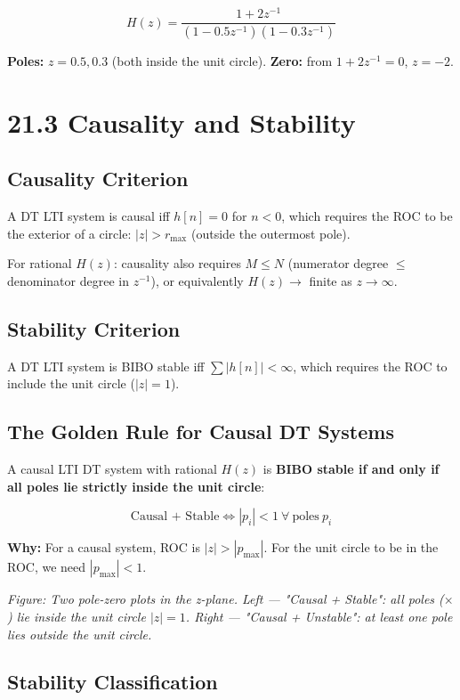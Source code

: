 \documentclass[11pt]{article}
\begin{document}
\[H(z) = \frac{1 + 2 z^{-1}}{(1 - 0.5 z^{-1})(1 - 0.3 z^{-1})}\]

\textbf{Poles:} $z = 0.5, 0.3$ (both inside the unit circle). \textbf{Zero:} from $1 + 2 z^{-1} = 0$, $z = -2$.

\section*{21.3 Causality and Stability}

\subsection*{Causality Criterion}

A DT LTI system is causal iff $h[n] = 0$ for $n < 0$, which requires the ROC to be the exterior of a circle: $|z| > r_{\max}$ (outside the outermost pole).

For rational $H(z)$: causality also requires $M \leq N$ (numerator degree $\leq$ denominator degree in $z^{-1}$), or equivalently $H(z) \to$ finite as $z \to \infty$.

\subsection*{Stability Criterion}

A DT LTI system is BIBO stable iff $\sum |h[n]| < \infty$, which requires the ROC to include the unit circle ($|z| = 1$).

\subsection*{The Golden Rule for Causal DT Systems}

A causal LTI DT system with rational $H(z)$ is \textbf{BIBO stable if and only if all poles lie strictly inside the unit circle}:

\[\text{Causal + Stable} \iff |p_i| < 1 \ \forall \ \text{poles}\ p_i\]

\textbf{Why:} For a causal system, ROC is $|z| > |p_{\max}|$. For the unit circle to be in the ROC, we need $|p_{\max}| < 1$.

\textit{Figure: Two pole-zero plots in the z-plane. Left — "Causal + Stable": all poles ($\times$) lie inside the unit circle $|z| = 1$. Right — "Causal + Unstable": at least one pole lies outside the unit circle.}

\subsection*{Stability Classification}
\end{document}
